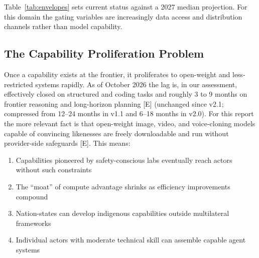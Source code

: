 \documentclass[11pt,letterpaper]{article}
\begin{document}
Table~\ref{tab:envelopes} sets current status against a 2027 median projection. For this domain the gating variables are increasingly data access and distribution channels rather than model capability.


\subsection{The Capability Proliferation Problem}

Once a capability exists at the frontier, it proliferates to open-weight and less-restricted systems rapidly. As of October 2026 the lag is, in our assessment, effectively closed on structured and coding tasks and roughly 3 to 9 months on frontier reasoning and long-horizon planning [E] (unchanged since v2.1; compressed from 12--24 months in v1.1 and 6--18 months in v2.0). For this report the more relevant fact is that open-weight image, video, and voice-cloning models capable of convincing likenesses are freely downloadable and run without provider-side safeguards [E]. This means:


\begin{enumerate}
  \item Capabilities pioneered by safety-conscious labs eventually reach actors without such constraints
  \item The ``moat'' of compute advantage shrinks as efficiency improvements compound
  \item Nation-states can develop indigenous capabilities outside multilateral frameworks
  \item Individual actors with moderate technical skill can assemble capable agent systems
\end{enumerate}
\end{document}
